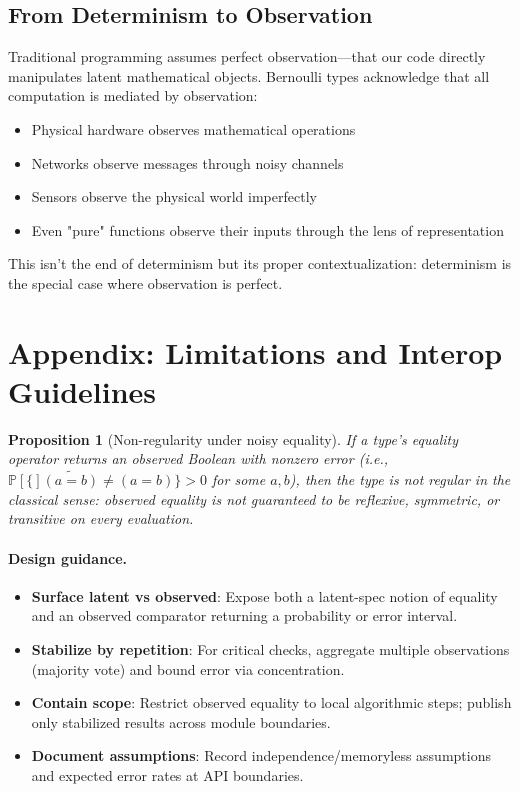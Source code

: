 \documentclass[11pt,final,hidelinks]{article}
\newtheorem{proposition}[theorem]{Proposition}
\newcommand{\obs}[1]{\widetilde{#1}}  %
\newcommand{\Prob}[1]{\mathbb{P}\left[#1\right]}
\begin{document}
\subsection{From Determinism to Observation}

Traditional programming assumes perfect observation—that our code directly manipulates latent mathematical objects. Bernoulli types acknowledge that all computation is mediated by observation:
\begin{itemize}
    \item Physical hardware observes mathematical operations
    \item Networks observe messages through noisy channels  
    \item Sensors observe the physical world imperfectly
    \item Even "pure" functions observe their inputs through the lens of representation
\end{itemize}

This isn't the end of determinism but its proper contextualization: determinism is the special case where observation is perfect.

\section{Appendix: Limitations and Interop Guidelines}

\begin{proposition}[Non-regularity under noisy equality]
If a type's equality operator returns an observed Boolean with nonzero error (i.e., $\Prob\{\obs{(a=b)}\neq (a=b)\}>0$ for some $a,b$), then the type is not regular in the classical sense: observed equality is not guaranteed to be reflexive, symmetric, or transitive on every evaluation.
\end{proposition}

\paragraph{Design guidance.}
\begin{itemize}
  \item \textbf{Surface latent vs observed}: Expose both a latent-spec notion of equality and an observed comparator returning a probability or error interval.
  \item \textbf{Stabilize by repetition}: For critical checks, aggregate multiple observations (majority vote) and bound error via concentration.
  \item \textbf{Contain scope}: Restrict observed equality to local algorithmic steps; publish only stabilized results across module boundaries.
  \item \textbf{Document assumptions}: Record independence/memoryless assumptions and expected error rates at API boundaries.
\end{itemize}
\end{document}

